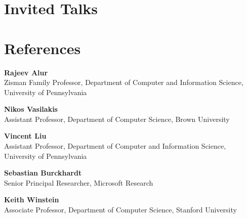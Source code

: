 \documentclass[margin]{res}
\begin{document}
\begin{resume}
\section{Invited Talks}



\section{References}

\textbf{Rajeev Alur}\\
Zisman Family Professor, Department of Computer and Information Science, University of Pennsylvania

\textbf{Nikos Vasilakis}\\
Assistant Professor, Department of Computer Science, Brown University

\textbf{Vincent Liu}\\
Assistant Professor, Department of Computer and Information Science, University of Pennsylvania

\textbf{Sebastian Burckhardt}\\
Senior Principal Researcher, Microsoft Research

\textbf{Keith Winstein}\\
Associate Professor, Department of Computer Science, Stanford University





\end{resume}
\end{document}
